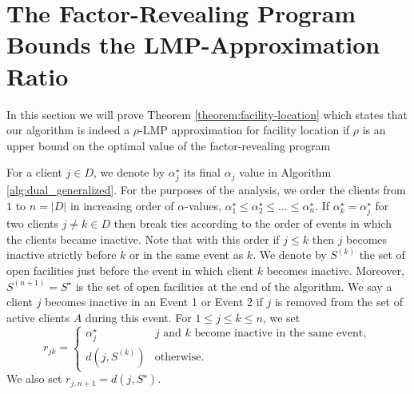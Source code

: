 \section{The Factor-Revealing Program Bounds the LMP-Approximation Ratio}
\label{sec:proof-lmp-approx-ratio-greedy}
In this section we will prove Theorem \ref{theorem:facility-location} which states that our algorithm is indeed a $\rho$-LMP approximation for facility location if $\rho$ is an upper bound on the optimal value of the factor-revealing program

\theoremfacilitylocation*

For a client $j \in D$, we denote by $\alpha_j^\star$ its final $\alpha_j$ value in Algorithm \ref{alg:dual_generalized}.
For the purposes of the analysis, we order the clients from $1$ to $n=|D|$ in increasing order of $\alpha$-values, $\alpha^\star_1 \le \alpha^\star_2 \le \dots \le \alpha^\star_n$. If $\alpha^\star_k = \alpha^\star_j$ for two clients $j \neq k \in D$ then break ties according to the order of events in which the clients became inactive. Note that with this order if $j \le k$ then $j$ becomes inactive strictly before $k$ or in the same event as $k$.
We denote by $S^{(k)}$ the set of open facilities just before the event in which client $k$ becomes inactive.
Moreover, $S^{(n+1)} = S^\star$ is the set of open facilities at the end of the algorithm. We say a client $j$ becomes inactive in an Event 1 or Event 2 if $j$ is removed from the set of active clients $A$ during this event.
For $1 \le j \leq k \le n$, we set 
\[
    r_{jk} = 
    \begin{cases}
        \alpha^\star_j & \text{$j$ and $k$ become inactive in the same event}, \\
        d(j, S^{(k)}) & \text{otherwise}.
    \end{cases}
\]
We also set $r_{j,n+1} = d(j, S^\star)$. 

